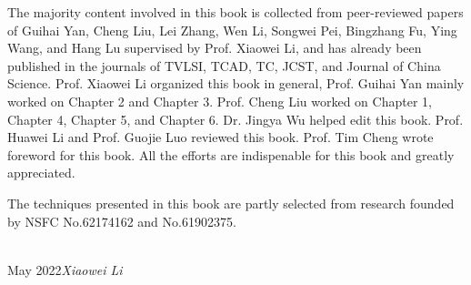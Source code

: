The majority content involved in this book is collected from peer-reviewed papers of Guihai Yan, Cheng Liu, Lei Zhang, Wen Li, Songwei Pei, Bingzhang Fu, Ying Wang, and Hang Lu supervised by Prof. Xiaowei Li, and has already been published in the journals of TVLSI, TCAD, TC, JCST, and Journal of China Science. Prof. Xiaowei Li organized this book in general, Prof. Guihai Yan mainly worked on Chapter 2 and Chapter 3. Prof. Cheng Liu worked on Chapter 1, Chapter 4, Chapter 5, and Chapter 6. Dr. Jingya Wu helped edit this book. Prof. Huawei Li and Prof. Guojie Luo reviewed this book. Prof. Tim Cheng wrote foreword for this book. All the efforts are indispenable for this book and greatly appreciated.

The techniques presented in this book are partly selected from research founded by NSFC No.62174162 and No.61902375. 

\vspace{\baselineskip}
\begin{flushright}\noindent
{} \\
May 2022\hfill {\it Xiaowei Li}\\
\end{flushright}


